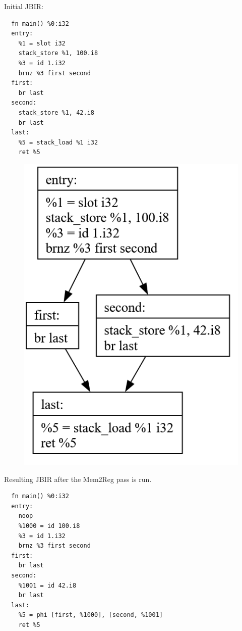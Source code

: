 \documentclass[11pt, a4paper, titlepage]{article}
\begin{document}
Initial JBIR:
\begin{lstlisting}
  fn main() %0:i32
  entry:
    %1 = slot i32
    stack_store %1, 100.i8
    %3 = id 1.i32
    brnz %3 first second
  first:
    br last
  second:
    stack_store %1, 42.i8
    br last
  last:
    %5 = stack_load %1 i32
    ret %5
\end{lstlisting}

\begin{figure}[H]
  \centering
  \includegraphics[scale=0.3]{images/i4.png}
\end{figure}

Resulting JBIR after the Mem2Reg pass is run.

\begin{lstlisting}
  fn main() %0:i32
  entry:
    noop
    %1000 = id 100.i8
    %3 = id 1.i32
    brnz %3 first second
  first:
    br last
  second:
    %1001 = id 42.i8
    br last
  last:
    %5 = phi [first, %1000], [second, %1001]
    ret %5
\end{lstlisting}
\end{document}

